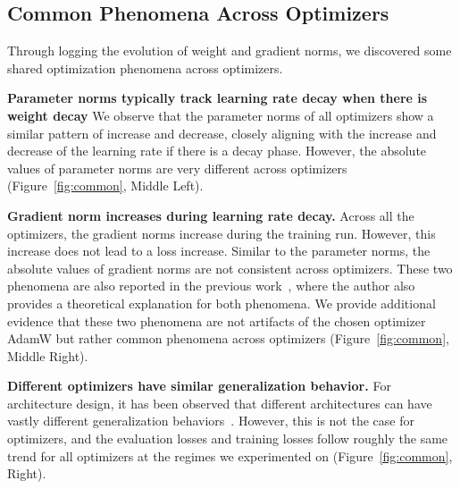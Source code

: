 \subsection{Common Phenomena Across Optimizers}


Through logging the evolution of weight and gradient norms, we discovered some shared optimization phenomena across optimizers.

\textbf{Parameter norms typically track learning rate decay when there is weight decay} We observe that the parameter norms of all optimizers show a similar pattern of increase and decrease, closely aligning with the increase and decrease of the learning rate if there is a decay phase. However, the absolute values of parameter norms are very different across optimizers (Figure~\ref{fig:common}, Middle Left).

\textbf{Gradient norm increases during learning rate decay.} Across all the optimizers, the gradient norms increase during the training run. However, this increase does not lead to a loss increase. Similar to the parameter norms, the absolute values of gradient norms are not consistent across optimizers.
These two phenomena are also reported in the previous work~\cite{defazio2025gradientsrapidlyincreasenear}, where the author also provides a theoretical explanation for both phenomena. We provide additional evidence that these two phenomena are not artifacts of the chosen optimizer AdamW but rather common phenomena across optimizers (Figure~\ref{fig:common}, Middle Right).


\textbf{Different optimizers have similar generalization behavior.} For architecture design, it has been observed that different architectures can have vastly different generalization behaviors~\cite{lu2025doessequencemodelingarchitecture}. However, this is not the case for optimizers, and the evaluation losses and training losses follow roughly the same trend for all optimizers at the regimes we experimented on (Figure~\ref{fig:common}, Right).







